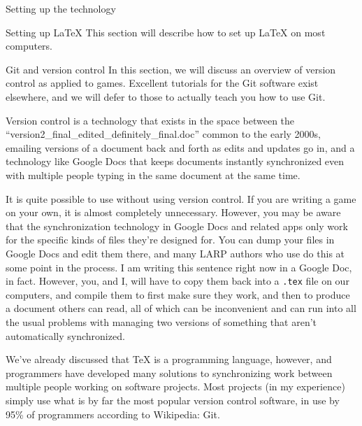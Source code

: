 \documentclass{article}
\begin{document}
\begin{section}{Setting up the technology}
\begin{subsection}{Setting up \LaTeX{}}
This section will describe how to set up \LaTeX{} on most computers.
\end{subsection}
\begin{subsection}{Git and version control}
In this section, we will discuss an overview of version control as applied to games.  Excellent tutorials for the Git software exist elsewhere, and we will defer to those to actually teach you how to use Git.

Version control is a technology that exists in the space between the ``version2\_final\_edited\_definitely\_final.doc'' common to the early 2000s, emailing versions of a document back and forth as edits and updates go in, and a technology like Google Docs that keeps documents instantly synchronized even with multiple people typing in the same document at the same time.

It is quite possible to use \gametex{} without using version control.  If you are writing a game on your own, it is almost completely unnecessary.  However, you may be aware that the synchronization technology in Google Docs and related apps only work for the specific kinds of files they're designed for.  You can dump your \gametex{} files in Google Docs and edit them there, and many LARP authors who use \gametex{} do this at some point in the process.  I am writing this sentence right now in a Google Doc, in fact.  However, you, and I, will have to copy them back into a \texttt{.tex} file on our computers, and compile them to first make sure they work, and then to produce a document others can read, all of which can be inconvenient and can run into all the usual problems with managing two versions of something that aren't automatically synchronized.

We've already discussed that \TeX{} is a programming language, however, and programmers have developed many solutions to synchronizing work between multiple people working on software projects.  Most \gametex{} projects (in my experience) simply use what is by far the most popular version control software, in use by 95\% of programmers according to Wikipedia: Git.


\end{subsection}
\end{section}
\end{document}
